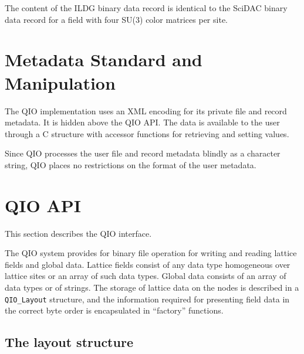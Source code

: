 \documentclass{article}
\begin{document}
The content of the ILDG binary data record is identical to the SciDAC
binary data record for a field with four SU(3) color matrices per site.

\section{Metadata Standard and Manipulation}

The QIO implementation uses an XML encoding for its private file and
record metadata.  It is hidden above the QIO API.  The data is
available to the user through a C structure with accessor functions
for retrieving and setting values.  

Since QIO processes the user file and record metadata blindly as a
character string, QIO places no restrictions on the format of the user
metadata.


\section{QIO API}

This section describes the QIO interface.

The QIO system provides for binary file operation for writing and
reading lattice fields and global data.  Lattice fields consist of any
data type homogeneous over lattice sites or an array of such data
types.  Global data consists of an array of data types or of strings.
The storage of lattice data on the nodes is described in a
\verb|QIO_Layout| structure, and the information required for
presenting field data in the correct byte order is encapsulated in
``factory'' functions.

\subsection{The layout structure}
\end{document}
